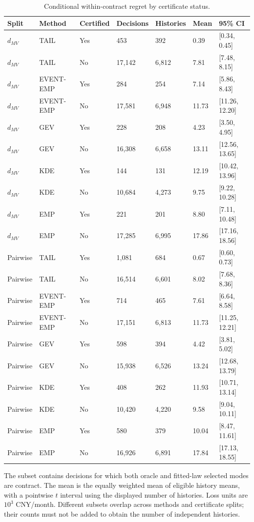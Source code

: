 \begingroup
\fontsize{8.5}{10.5}\selectfont\setlength{\tabcolsep}{3.0pt}\renewcommand{\arraystretch}{1.23}
\begin{table}[tbp]\centering
\caption{Conditional within-contract regret by certificate status.}\label{tab:si-certificate}
\begin{tabular}{@{}lllllll@{}}\toprule
Split & Method & Certified & Decisions & Histories & Mean & 95\% CI\\\midrule
$d_{MV}$ & TAIL & Yes & 453 & 392 & 0.39 & [0.34, 0.45]\\
$d_{MV}$ & TAIL & No & 17,142 & 6,812 & 7.81 & [7.48, 8.15]\\
$d_{MV}$ & EVENT-EMP & Yes & 284 & 254 & 7.14 & [5.86, 8.43]\\
$d_{MV}$ & EVENT-EMP & No & 17,581 & 6,948 & 11.73 & [11.26, 12.20]\\
$d_{MV}$ & GEV & Yes & 228 & 208 & 4.23 & [3.50, 4.95]\\
$d_{MV}$ & GEV & No & 16,308 & 6,658 & 13.11 & [12.56, 13.65]\\
$d_{MV}$ & KDE & Yes & 144 & 131 & 12.19 & [10.42, 13.96]\\
$d_{MV}$ & KDE & No & 10,684 & 4,273 & 9.75 & [9.22, 10.28]\\
$d_{MV}$ & EMP & Yes & 221 & 201 & 8.80 & [7.11, 10.48]\\
$d_{MV}$ & EMP & No & 17,285 & 6,995 & 17.86 & [17.16, 18.56]\\
Pairwise & TAIL & Yes & 1,081 & 684 & 0.67 & [0.60, 0.73]\\
Pairwise & TAIL & No & 16,514 & 6,601 & 8.02 & [7.68, 8.36]\\
Pairwise & EVENT-EMP & Yes & 714 & 465 & 7.61 & [6.64, 8.58]\\
Pairwise & EVENT-EMP & No & 17,151 & 6,813 & 11.73 & [11.25, 12.21]\\
Pairwise & GEV & Yes & 598 & 394 & 4.42 & [3.81, 5.02]\\
Pairwise & GEV & No & 15,938 & 6,526 & 13.24 & [12.68, 13.79]\\
Pairwise & KDE & Yes & 408 & 262 & 11.93 & [10.71, 13.14]\\
Pairwise & KDE & No & 10,420 & 4,220 & 9.58 & [9.04, 10.11]\\
Pairwise & EMP & Yes & 580 & 379 & 10.04 & [8.47, 11.61]\\
Pairwise & EMP & No & 16,926 & 6,891 & 17.84 & [17.13, 18.55]\\
\bottomrule
\end{tabular}
\par\smallskip\noindent\begin{minipage}{\linewidth}\footnotesize The subset contains decisions for which both oracle and fitted-law selected modes are contract. The mean is the equally weighted mean of eligible history means, with a pointwise $t$ interval using the displayed number of histories. Loss units are $10^3$ CNY/month. Different subsets overlap across methods and certificate splits; their counts must not be added to obtain the number of independent histories.\end{minipage}
\end{table}
\endgroup
